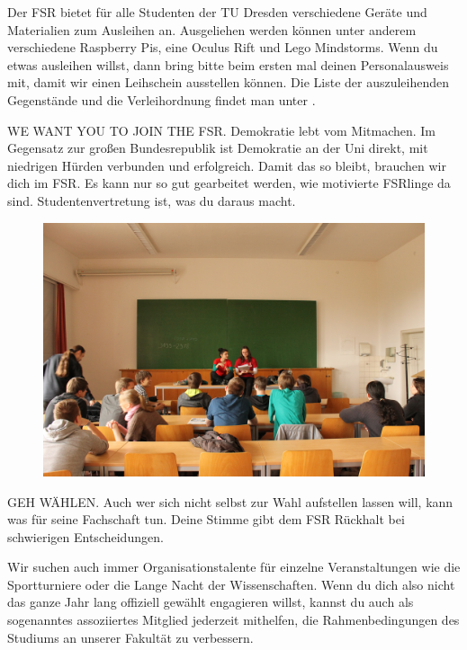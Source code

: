 Der FSR bietet für alle Studenten der TU Dresden verschiedene Geräte und Materialien zum Ausleihen an. Ausgeliehen werden können unter anderem verschiedene Raspberry Pis, eine Oculus Rift und Lego Mindstorms.
 Wenn du etwas ausleihen willst, dann bring bitte beim ersten mal deinen Personalausweis mit, damit wir einen Leihschein ausstellen können. 
Die Liste der auszuleihenden Gegenstände und die Verleihordnung findet man unter .

WE WANT YOU TO JOIN THE FSR.
Demokratie lebt vom Mitmachen.
Im Gegensatz zur großen Bundesrepublik ist Demokratie an der Uni direkt, mit niedrigen Hürden verbunden und erfolgreich.
Damit das so bleibt, brauchen wir dich im FSR.
Es kann nur so gut gearbeitet werden, wie motivierte FSRlinge da sind.
Studentenvertretung ist, was du daraus macht.

\begin{figure}
\includegraphics[width=\linewidth]{img/ese2013/tutorium.jpg}
\end{figure}

GEH WÄHLEN.
Auch wer sich nicht selbst zur Wahl aufstellen lassen will, kann was für seine Fachschaft tun.
Deine Stimme gibt dem FSR Rückhalt bei schwierigen Entscheidungen.

Wir suchen auch immer Organisationstalente für einzelne Veranstaltungen wie die Sportturniere oder die Lange Nacht der Wissenschaften.
Wenn du dich also nicht das ganze Jahr lang offiziell gewählt engagieren willst, kannst du auch als sogenanntes assoziiertes Mitglied jederzeit mithelfen, die Rahmenbedingungen des Studiums an unserer Fakultät zu verbessern.

